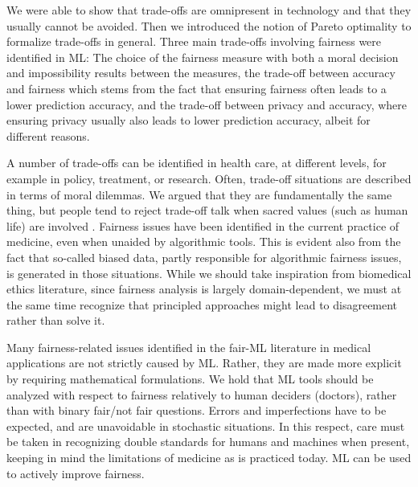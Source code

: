 We were able to show that trade-offs are omnipresent in technology and that they usually cannot be avoided.
Then we introduced the notion of Pareto optimality to formalize trade-offs in general.
Three main trade-offs involving fairness were identified in ML: The choice of the fairness measure with both a moral decision and impossibility results between the measures, the trade-off between accuracy and fairness which stems from the fact that ensuring fairness often leads to a lower prediction accuracy, and the trade-off between privacy and accuracy, where ensuring privacy usually also leads to lower prediction accuracy, albeit for different reasons.

A number of trade-offs can be identified in health care, at different levels, for example in policy, treatment, or research.
Often, trade-off situations are described in terms of moral dilemmas. We argued that they are fundamentally the same thing, but people tend to reject trade-off talk when sacred values (such as human life) are involved \cite{Tetlock2003}.
Fairness issues have been identified in the current practice of medicine, even when unaided by algorithmic tools. This is evident also from the fact that so-called biased data, partly responsible for algorithmic fairness issues, is generated in those situations.
While we should take inspiration from biomedical ethics literature, since fairness analysis is largely domain-dependent, we must at the same time recognize that principled approaches might lead to disagreement rather than solve it.

Many fairness-related issues identified in the fair-ML literature in medical applications are not strictly caused by ML. Rather, they are made more explicit by requiring mathematical formulations.
We hold that ML tools should be analyzed with respect to fairness relatively to human deciders (doctors), rather than with binary fair/not fair questions. Errors and imperfections have to be expected, and are unavoidable in stochastic situations. In this respect, care must be taken in recognizing double standards for humans and machines when present, keeping in mind the limitations of medicine as is practiced today.
ML can be used to actively improve fairness.
